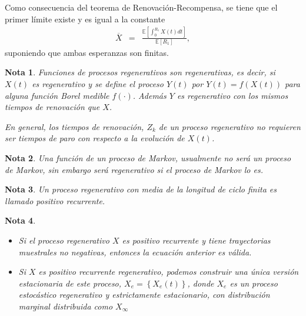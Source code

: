 \documentclass{article}
\newtheorem{Note}{Nota}
\newcommand{\esp}{\mathbb{E}}
\begin{document}
Como consecuencia del teorema de Renovaci\'on-Recompensa, se tiene que el primer l\'imite  existe y es igual a la constante
\begin{eqnarray*}
\overline{X}&=&\frac{\esp\left[\int_{0}^{R_{1}}X\left(t\right)dt\right]}{\esp\left[R_{1}\right]},
\end{eqnarray*}
suponiendo que ambas esperanzas son finitas.
 
\begin{Note}
Funciones de procesos regenerativos son regenerativas, es decir, si $X\left(t\right)$ es regenerativo y se define el proceso $Y\left(t\right)$ por $Y\left(t\right)=f\left(X\left(t\right)\right)$ para alguna funci\'on Borel medible $f\left(\cdot\right)$. Adem\'as $Y$ es regenerativo con los mismos tiempos de renovaci\'on que $X$. 

En general, los tiempos de renovaci\'on, $Z_{k}$ de un proceso regenerativo no requieren ser tiempos de paro con respecto a la evoluci\'on de $X\left(t\right)$.
\end{Note} 

\begin{Note}
Una funci\'on de un proceso de Markov, usualmente no ser\'a un proceso de Markov, sin embargo ser\'a regenerativo si el proceso de Markov lo es.
\end{Note}

 
\begin{Note}
Un proceso regenerativo con media de la longitud de ciclo finita es llamado positivo recurrente.
\end{Note}


\begin{Note}
\begin{itemize}
\item[a)] Si el proceso regenerativo $X$ es positivo recurrente y tiene trayectorias muestrales no negativas, entonces la ecuaci\'on anterior es v\'alida.
\item[b)] Si $X$ es positivo recurrente regenerativo, podemos construir una \'unica versi\'on estacionaria de este proceso, $X_{e}=\left\{X_{e}\left(t\right)\right\}$, donde $X_{e}$ es un proceso estoc\'astico regenerativo y estrictamente estacionario, con distribuci\'on marginal distribuida como $X_{\infty}$
\end{itemize}
\end{Note}


\end{document}
